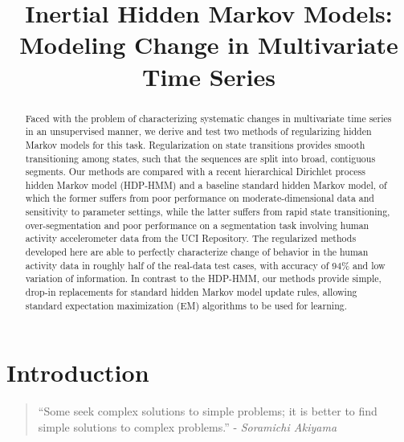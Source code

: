 \documentclass[letterpaper]{article}
\title{Inertial Hidden Markov Models: Modeling Change in Multivariate Time Series}
\newenvironment{dedication}
        {\vspace{0.0ex}\begin{quotation}\begin{center}\begin{em}}
        {\par\end{em}\end{center}\end{quotation}}
\begin{document}
\maketitle

\begin{abstract}
    Faced with the problem of characterizing systematic changes in multivariate
    time series in an unsupervised manner, we derive and test two methods of regularizing hidden
    Markov models for this task. Regularization on state transitions provides
    smooth transitioning among states, such that the sequences are split into
    broad, contiguous segments. Our methods are compared with a recent
    hierarchical Dirichlet process hidden Markov model (HDP-HMM) and a baseline
    standard hidden Markov model, of which the former suffers from poor
    performance on moderate-dimensional data and sensitivity to parameter
    settings, while the latter suffers from rapid state transitioning,
    over-segmentation and poor performance on a segmentation task involving
    human activity accelerometer data from the UCI Repository.
    The regularized methods developed here are able to perfectly characterize
    change of behavior in the human activity data in roughly half of the real-data
    test cases, with accuracy of 94\% and low variation of information. In contrast to the
    HDP-HMM, our methods provide simple, drop-in replacements for standard
    hidden Markov model update rules, allowing standard expectation maximization
    (EM) algorithms to be used for learning. 
\end{abstract}

\section{Introduction}

\begin{dedication} ``Some seek complex solutions to simple problems; it is better to find simple solutions to complex problems.'' - \emph{Soramichi Akiyama}
\end{dedication}
\end{document}
